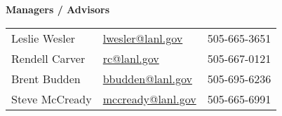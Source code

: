
\begin{minipage}{0.45\textwidth} 
	\begin{center}
		{\normalsize \textbf{Managers / Advisors}}
	\end{center}
	\begin{tabular}{lll|}
		Leslie Wesler &   \href{mailto:lwesler@lanl.gov}{lwesler@lanl.gov} & 505-665-3651 \\
		Rendell Carver &   \href{mailto:rc@lanl.gov}{rc@lanl.gov} & 505-667-0121 \\
		Brent Budden & \href{mailto:bbudden@lanl.gov}{bbudden@lanl.gov} & 505-695-6236 \\
		Steve McCready & \href{mailto:mccready@lanl.gov}{mccready@lanl.gov} & 505-665-6991 \\

	\end{tabular}
\end{minipage}%
\hspace{2mm}
